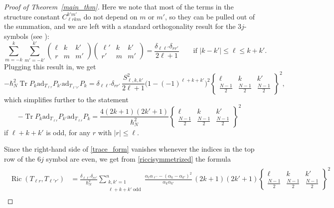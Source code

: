 \documentclass[11pt]{amsart}
\numberwithin{equation}{section}
\theoremstyle{definition}
\DeclareMathOperator{\Tr}{Tr}
\newcommand{\ad}{\mathrm{ad}}
\DeclareMathOperator{\Ric}{Ric}
\newcommand{\weight}{\alpha}
\begin{document}
\begin{proof}[Proof of Theorem~\ref{main_thm}]
Here we note that most of the terms in the structure constant $C^{k' m'}_{\ell r k m}$ do not depend on $m$ or $m'$, so they can be pulled out of the summation, and we are left with a standard orthogonality result for the $3j$-symbols (see \cite{Varshalovich1988quantum}):
$$\sum_{m=-k}^{k} \sum_{m'=-k'}^{k'} 
\left(\begin{matrix}
\ell & k & k' \\
r & m & m'
\end{matrix}
\right)
\left(\begin{matrix}
\ell' & k & k' \\
r' & m & m'
\end{matrix}
\right) = \frac{\delta_{\ell\ell'} \delta_{rr'}}{2\ell+1} \qquad \text{if $\lvert k-k'\rvert \le \ell\le k+k'$}.
$$
Plugging this result in, we get 
\begin{equation}\label{trace_form}
-\hbar_N^2 \Tr{P_{k}\ad_{T_{\ell r}} P_{k'}\ad_{T_{\ell' r'}} P_{k}} = \delta_{\ell\ell'} \delta_{rr'} \,
\frac{S_{\ell,k,k'}^2}{2\ell+1} \Big(1 - (-1)^{\ell+k+k'}\Big)^2
\left\{\begin{matrix}
\ell & k & k' \\
\frac{N-1}{2} & \frac{N-1}{2} & \frac{N-1}{2}
\end{matrix}
\right\}^2,
\end{equation}
which simplifies further to the statement 
\begin{equation*}
-\Tr{P_{k}\ad_{T_{\ell r}} P_{k'}\ad_{T_{\ell r}} P_{k}} = 
\frac{4 (2k+1)(2k'+1)}{ \hbar_N^2 } \left\{\begin{matrix}
\ell & k & k' \\
\frac{N-1}{2} & \frac{N-1}{2} & \frac{N-1}{2}
\end{matrix}
\right\}^2
\end{equation*}
if $\ell+k+k'$ is odd, for any $r$ with $\lvert r\rvert \le \ell$.  

Since the right-hand side of \eqref{trace_form} vanishes whenever the indices in the top row of the $6j$ symbol are even, we get from \eqref{riccisymmetrized} the formula
\begin{gather*}
\begin{split}
\Ric(T_{\ell r},T_{\ell' r'}) &= \frac{\delta_{\ell\ell'}\delta_{rr'}}{\hbar_N^2} \sum\limits_{\substack{k, k' = 1 \\ \ell+k+k'\;\mathrm{odd}}}^n \frac{\weight_{\ell}\weight_{\ell'} - (\weight_{k}-\weight_{k'})^2}{\weight_{k}\weight_{k'}} 
\, (2k+1)(2k'+1)  \left\{\begin{matrix}
\ell & k & k' \\
\frac{N-1}{2} & \frac{N-1}{2} & \frac{N-1}{2}
\end{matrix}
\right\}^2
\end{split}
\end{gather*}


\end{proof}
\end{document}
